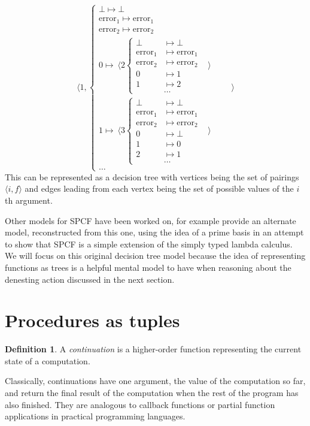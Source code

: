 \documentclass[12pt,a4paper]{report}
\theoremstyle{definition}
\newtheorem{definition}{Definition}[chapter]%
\theoremstyle{remark}
\begin{document}
\[\langle 1, 
\begin{cases}
    \bot \mapsto \bot\\
    \text{error}_1 \mapsto \text{error}_1\\
    \text{error}_2 \mapsto \text{error}_2\\
    0 \mapsto\ \langle 2 \begin{cases}
        \bot &\mapsto \bot\\
        \text{error}_1 &\mapsto \text{error}_1\\
        \text{error}_2 &\mapsto \text{error}_2\\
        0 &\mapsto 1\\
        1 &\mapsto 2\\
          &\dots
    \end{cases} &\rangle\\
    1 \mapsto\ \langle 3 \begin{cases}
        \bot &\mapsto \bot\\
        \text{error}_1 &\mapsto \text{error}_1\\
        \text{error}_2 &\mapsto \text{error}_2\\
        0 &\mapsto \bot\\
        1 &\mapsto 0\\
        2 &\mapsto 1\\
          &\dots
    \end{cases} &\rangle\\
    \dots
\end{cases} \quad\quad\rangle
\]
This can be represented as a decision tree with vertices being the set of pairings  $\langle i, f \rangle$ and edges leading from each vertex being the set of possible values of the $i$th argument. 

Other models for SPCF have been worked on, for example \cite{kanneganti_1993} provide an alternate model, reconstructed from this one, using the idea of a prime basis \citep{Winskel1980EventsIC} in an attempt to show that SPCF is a simple extension of the simply typed lambda calculus. We will focus on this original decision tree model because the idea of representing functions as trees is a helpful mental model to have when reasoning about the denesting action discussed in the next section.

\section{Procedures as tuples}
\begin{definition}
    A \emph{continuation} is a higher-order function representing the current state of a computation.
    
    Classically, continuations have one argument, the value of the computation so far, and return the final result of the computation when the rest of the program has also finished. They are analogous to callback functions or partial function applications in practical programming languages. 
\end{definition}
\end{document}
